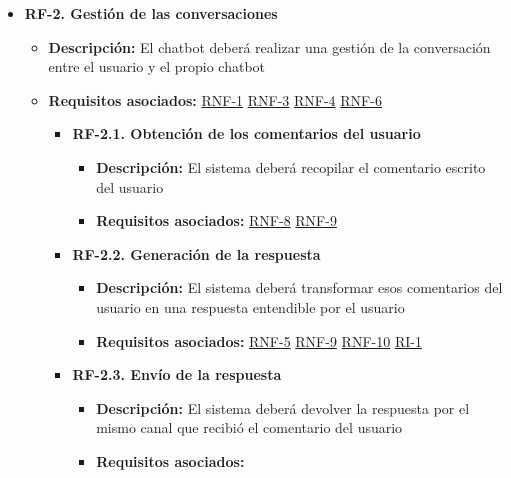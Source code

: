 \begin{itemize}
    \item \textbf{RF-2. Gestión de las conversaciones} \label{RF-2}
    \begin{itemize}
        \item \textbf{Descripción:} El chatbot deberá realizar una gestión de la conversación entre el usuario y el propio chatbot
        \item \textbf{Requisitos asociados:} \hyperref[RNF-1]{RNF-1} \hyperref[RNF-3]{RNF-3} \hyperref[RNF-4]{RNF-4} \hyperref[RNF-6]{RNF-6}
        \begin{itemize}
            \item \textbf{RF-2.1. Obtención de los comentarios del usuario} \label{RF-2.1}
            \begin{itemize}
                \item \textbf{Descripción:} El sistema deberá recopilar el comentario escrito del usuario
                \item \textbf{Requisitos asociados:} \hyperref[RNF-8]{RNF-8} \hyperref[RNF-9]{RNF-9}
            \end{itemize}
            
            \item \textbf{RF-2.2. Generación de la respuesta}\label{RF-2.2}
            \begin{itemize}
                \item \textbf{Descripción:} El sistema deberá transformar esos comentarios del usuario en una respuesta entendible por el usuario
                \item \textbf{Requisitos asociados:} \hyperref[RNF-5]{RNF-5} \hyperref[RNF-9]{RNF-9} \hyperref[RNF-10]{RNF-10} \hyperref[RI-1]{RI-1}
            \end{itemize}
            
            \item \textbf{RF-2.3. Envío de la respuesta} \label{RF-2.3}
            \begin{itemize}
                \item \textbf{Descripción:} El sistema deberá devolver la respuesta por el mismo canal que recibió el comentario del usuario
                \item \textbf{Requisitos asociados:} 
            \end{itemize}
        \end{itemize}
    \end{itemize}
    

\end{itemize}
